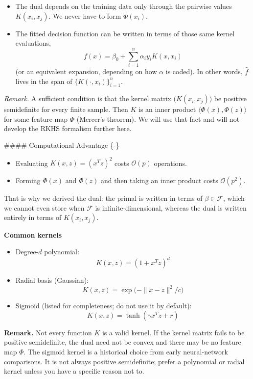 \documentclass[
]{book}
\providecommand{\tightlist}{%
  \setlength{\itemsep}{0pt}\setlength{\parskip}{0pt}}
\begin{document}
\begin{itemize}
\tightlist
\item
  The dual depends on the training data only through the pairwise values \(K(x_i,x_j)\). We never have to form \(\Phi(x_i)\).
\item
  The fitted decision function can be written in terms of those same kernel evaluations,
  \[
  f(x)=\beta_0+\sum_{i=1}^{n}\alpha_i y_i K(x,x_i)
  \]
  (or an equivalent expansion, depending on how \(\alpha\) is coded). In other words, \(\hat f\) lives in the span of \(\{K(\cdot,x_i)\}_{i=1}^{n}\).
\end{itemize}

\emph{Remark.} A sufficient condition is that the kernel matrix \(\bigl(K(x_i,x_j)\bigr)\) be positive semidefinite for every finite sample. Then \(K\) is an inner product \(\langle\Phi(x),\Phi(z)\rangle\) for some feature map \(\Phi\) (Mercer's theorem). We will use that fact and will not develop the RKHS formalism further here.

\#\#\#\# Computational Advantage \{-\}

\begin{itemize}
\tightlist
\item
  Evaluating \(K(x,z)=(x^T z)^2\) costs \(\mathcal{O}(p)\) operations.
\item
  Forming \(\Phi(x)\) and \(\Phi(z)\) and then taking an inner product costs \(\mathcal{O}(p^2)\).
\end{itemize}

That is why we derived the dual: the primal is written in terms of \(\beta\in\mathcal{F}\), which we cannot even store when \(\mathcal{F}\) is infinite-dimensional, whereas the dual is written entirely in terms of \(K(x_i,x_j)\).

\textbf{Common kernels}

\begin{itemize}
\tightlist
\item
  Degree-\(d\) polynomial:
  \[
  K(x,z)=(1+x^T z)^d
  \]
\item
  Radial basis (Gaussian):
  \[
  K(x,z)=\exp\bigl(-\|x-z\|^2/c\bigr)
  \]
\item
  Sigmoid (listed for completeness; do not use it by default):
  \[
  K(x,z)=\tanh(\gamma x^T z + r)
  \]
\end{itemize}

\textbf{Remark.} Not every function \(K\) is a valid kernel. If the kernel matrix fails to be positive semidefinite, the dual need not be convex and there may be no feature map \(\Phi\). The sigmoid kernel is a historical choice from early neural-network comparisons. It is not always positive semidefinite; prefer a polynomial or radial kernel unless you have a specific reason not to.
\end{document}
